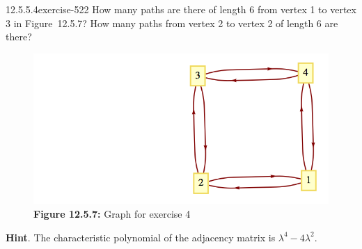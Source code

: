 \documentclass[twoside,10pt,]{book}
\numberwithin{equation}{section}
\begin{document}
\begin{divisionsolution}{12.5.5.4}{}{exercise-522}%
\hypertarget{p-4692}{}%
How many paths are there of length 6 from vertex 1 to vertex 3 in Figure~12.5.7? How many paths from vertex 2 to vertex 2 of length 6 are there?%
\begin{figure}
\centering
\includegraphics[width=0.7\linewidth]{images/fig-graph-12-5-2.png}
\caption*{\textbf{Figure 12.5.7:} Graph for exercise 4}
\end{figure}
\par\smallskip%
\noindent\textbf{Hint}.\quad%
\hypertarget{p-4693}{}%
The characteristic polynomial of the adjacency matrix is \(\lambda ^4 - 4 \lambda^2\).%
\end{divisionsolution}%
\end{document}
